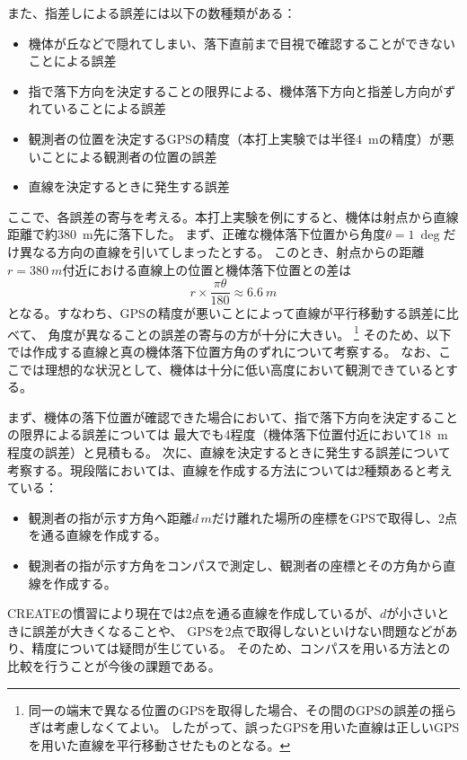 \documentclass[a4paper,11pt,titlepage,uplatex]{jsarticle}
\begin{document}
また、指差しによる誤差には以下の数種類がある：
\begin{itemize}
    \item 機体が丘などで隠れてしまい、落下直前まで目視で確認することができないことによる誤差
    \item 指で落下方向を決定することの限界による、機体落下方向と指差し方向がずれていることによる誤差
    \item 観測者の位置を決定するGPSの精度（本打上実験では半径\SI{4}{m}の精度）が悪いことによる観測者の位置の誤差
    \item 直線を決定するときに発生する誤差
\end{itemize}
ここで、各誤差の寄与を考える。本打上実験を例にすると、機体は射点から直線距離で約\SI{380}{m}先に落下した。
まず、正確な機体落下位置から角度$\theta = \SI{1}{\deg}$だけ異なる方向の直線を引いてしまったとする。
このとき、射点からの距離$r=\SI{380}{m}$付近における直線上の位置と機体落下位置との差は
\begin{equation}
    r\times\frac{\pi\theta}{180} \approx \SI{6.6}{m}
\end{equation}
となる。すなわち、GPSの精度が悪いことによって直線が平行移動する誤差に比べて、
角度が異なることの誤差の寄与の方が十分に大きい。
\footnote{同一の端末で異なる位置のGPSを取得した場合、その間のGPSの誤差の揺らぎは考慮しなくてよい。
したがって、誤ったGPSを用いた直線は正しいGPSを用いた直線を平行移動させたものとなる。}
そのため、以下では作成する直線と真の機体落下位置方角のずれについて考察する。
なお、ここでは理想的な状況として、機体は十分に低い高度において観測できているとする。

まず、機体の落下位置が確認できた場合において、指で落下方向を決定することの限界による誤差については
最大でも\SI{4}{\deg}程度（機体落下位置付近において\SI{18}{m}程度の誤差）と見積もる。
次に、直線を決定するときに発生する誤差について考察する。現段階においては、直線を作成する方法については2種類あると考えている：
\begin{itemize}
    \item 観測者の指が示す方角へ距離$d\,\si{m}$だけ離れた場所の座標をGPSで取得し、2点を通る直線を作成する。
    \item 観測者の指が示す方角をコンパスで測定し、観測者の座標とその方角から直線を作成する。
\end{itemize}
CREATEの慣習により現在では2点を通る直線を作成しているが、$d$が小さいときに誤差が大きくなることや、
GPSを2点で取得しないといけない問題などがあり、精度については疑問が生じている。
そのため、コンパスを用いる方法との比較を行うことが今後の課題である。
\end{document}
